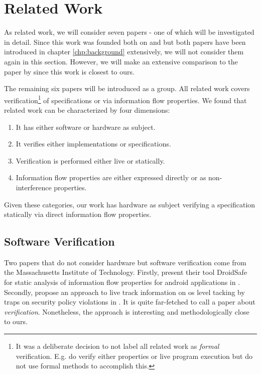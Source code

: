 
\chapter{Related Work}
\label{chp:related-work}

As related work, we will consider seven papers - one of which will be investigated in detail.
Since this work was founded both on  \cite{Reid17} and  \cite{Ferraiuolo17} but both papers have been introduced in chapter \ref{chp:background} extensively, we will not consider them again in this section.
However, we will make an extensive comparison to the paper  \cite{BradfieldS16} by \citeauthor{BradfieldS16} since this work is closest to ours.

The remaining six papers will be introduced as a group.
All related work covers verification\footnote{%
    It was a deliberate decision to not label all related work as \textit{formal} verification.
    E.g. \cite{Zhang15,SuhLZD04} do verify either properties or live program execution but do not use formal methods to accomplish this.
} of specifications or via information flow properties.
We found that related work can be characterized by four dimensions:
\begin{enumerate}
    \item It has either software or hardware as subject.
    \item It verifies either implementations or specifications.
    \item Verification is performed either live or statically.
    \item Information flow properties are either expressed directly or as non-interference properties.
\end{enumerate}

Given these categories, our work has hardware as subject verifying a specification statically via direct information flow properties.

\section{Software Verification}

Two papers that do not consider hardware but software verification come from the Massachusetts Institute of Technology.
Firstly, \citeauthor{GordonKPGNR15} present their tool DroidSafe for static analysis of information flow properties for android applications in  \cite{GordonKPGNR15}.
Secondly, \citeauthor{SuhLZD04} propose an approach to live track information on \gls{os} level tacking by traps on security policy violations in  \cite{SuhLZD04}.
It is quite far-fetched to call \cite{SuhLZD04} a paper about \textit{verification}.
Nonetheless, the approach is interesting and methodologically close to ours.

